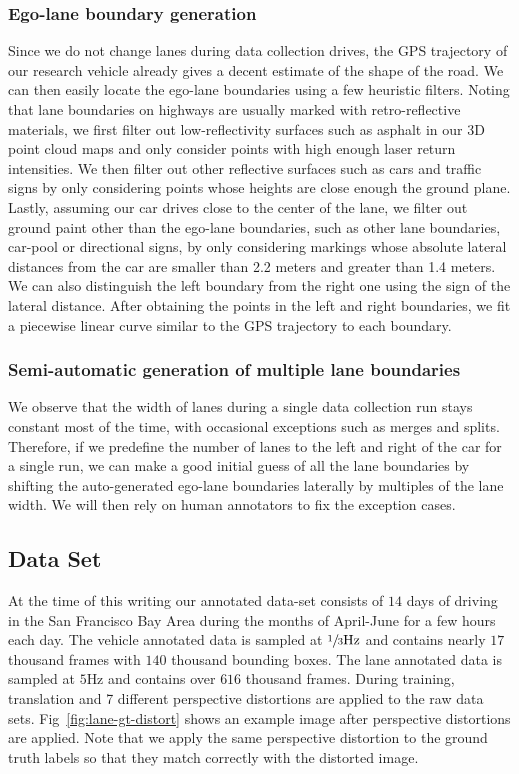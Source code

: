 \documentclass[journal]{IEEEtran}
\begin{document}
\subsubsection{Ego-lane boundary generation}
Since we do not change lanes during data collection drives, the GPS trajectory of our research vehicle already gives a decent estimate of the shape of the road. We can then easily locate the ego-lane boundaries using a few heuristic filters. Noting that lane boundaries on highways are usually marked with retro-reflective materials, we first filter out low-reflectivity surfaces such as asphalt in our 3D point cloud maps and only consider points with high enough laser return intensities. We then filter out other reflective surfaces such as cars and traffic signs by only considering points whose heights are close enough the ground plane.  Lastly, assuming our car drives close to the center of the lane, we filter out ground paint other than the ego-lane boundaries, such as other lane boundaries, car-pool or directional signs, by only considering markings whose absolute lateral distances from the car are smaller than 2.2 meters and greater than 1.4 meters. We can also distinguish the left boundary from the right one using the sign of the lateral distance. After obtaining the points in the left and right boundaries, we fit a piecewise linear curve similar to the GPS trajectory to each boundary.
 
\subsubsection{Semi-automatic generation of multiple lane boundaries}
We observe that the width of lanes during a single data collection run stays constant most of the time, with occasional exceptions such as merges and splits. Therefore, if we predefine the number of lanes to the left and right of the car for a single run, we can make a good initial guess of all the lane boundaries by shifting the auto-generated ego-lane boundaries laterally by multiples of the lane width. We will then rely on human annotators to fix the exception cases.
 
\subsection{Data Set}
At the time of this writing our annotated data-set consists of $14$ days of driving in the San Francisco Bay Area during the months of April-June for a few hours each day. The vehicle annotated data is sampled at $\sfrac{1}{3} \text{Hz}$ and contains nearly $17$ thousand frames with $140$ thousand bounding boxes. The lane annotated data is sampled at $5\text{Hz}$ and contains over $616$ thousand frames. During training, translation and 7 different perspective distortions are applied to the raw data sets. Fig~\ref{fig:lane-gt-distort} shows an example image after perspective distortions are applied. Note that we apply the same perspective distortion to the ground truth labels so that they match correctly with the distorted image.
\end{document}
